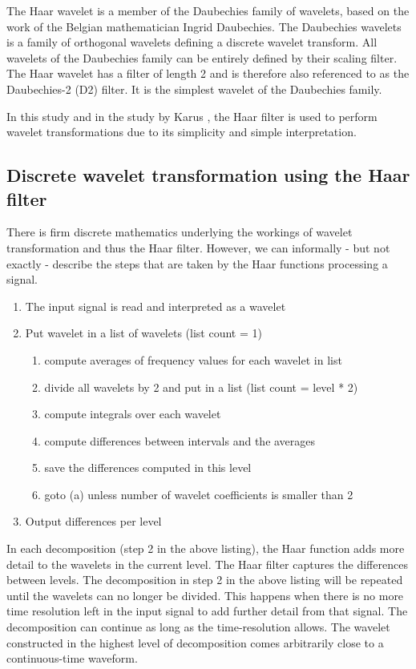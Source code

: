 The Haar wavelet is a member of the Daubechies family of wavelets, based on the
work of the Belgian mathematician Ingrid Daubechies. The Daubechies wavelets is
a family of orthogonal wavelets defining a discrete wavelet transform. All
wavelets of the Daubechies family can be entirely defined by their scaling
filter. The Haar wavelet has a filter of length 2 and is therefore also
referenced to as the Daubechies-2 (D2) filter. It is the simplest wavelet of
the Daubechies family.

In this study and in the study by Karus \cite{karus2013}, the Haar filter is
used to perform wavelet transformations due to its simplicity and simple
interpretation.

\subsection{Discrete wavelet transformation using the Haar filter}
There is firm discrete mathematics underlying the workings of wavelet
transformation and thus the Haar filter. However, we can informally - but not
exactly - describe the steps that are taken by the Haar functions processing a
signal.

\begin{enumerate}
	\item The input signal is read and interpreted as a wavelet
	\item Put wavelet in a list of wavelets (list count = 1)
		\begin{enumerate}
			\item compute averages of frequency values for each wavelet in list
			\item divide all wavelets by 2 and put in a list (list count = level * 2)
			\item compute integrals over each wavelet
			\item compute differences between intervals and the averages
			\item save the differences computed in this level
			\item goto (a) unless number of wavelet coefficients is smaller than 2
		\end{enumerate}
	\item Output differences per level
\end{enumerate}

In each decomposition (step 2 in the above listing), the Haar function adds
more detail to the wavelets in the current level. The Haar filter captures the
differences between levels. The decomposition in step 2 in the above listing
will be repeated until the wavelets can no longer be divided. This happens when
there is no more time resolution left in the input signal to add further detail
from that signal. The decomposition can continue as long as the time-resolution
allows. The wavelet constructed in the highest level of decomposition comes
arbitrarily close to a continuous-time waveform.

